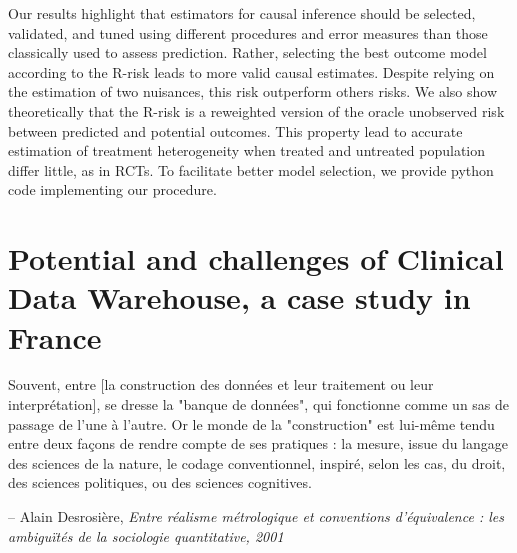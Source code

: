 \documentclass[french,12pt,twoside,a4paper]{book}
\newenvironment{citationbox}{
  \begin{tcolorbox}[
      enhanced,
      colback=gray!10, %
      colframe=white, %
      arc=0mm, %
      boxrule=0.5pt, %
      rightrule=0pt, %
      left=0pt, %
      right=0pt, %
      top=0pt, %
      bottom=0pt, %
      rightupper=0mm, %
      rightlower=0mm, %
      width=0.9\textwidth,
      flush right,
    ]
    \footnotesize %
    \itshape %
    }{
  \end{tcolorbox}%
}
\begin{document}
Our results highlight that estimators for causal inference should be selected,
validated, and tuned using different procedures and error measures than those
classically used to assess prediction. Rather, selecting the best outcome
model according to the R-risk leads to more valid causal estimates. Despite
relying on the estimation of two nuisances, this risk outperform others risks.
We also show theoretically that the R-risk is a reweighted version of the
oracle unobserved risk between predicted and potential outcomes. This property
lead to accurate estimation of treatment heterogeneity when treated and
untreated population differ little, as in RCTs. To facilitate better model
selection, we provide python code implementing our procedure.


\chapter{Potential and challenges of Clinical Data Warehouse, a case study in France}%
\label{chapter:cdw}%


\begin{citationbox}
  Souvent, entre [la construction des données et leur traitement ou leur
      interprétation], se dresse la "banque de données", qui fonctionne comme un
  sas de passage de l'une à l'autre. Or le monde de la "construction" est
  lui-même tendu entre deux façons de rendre compte de ses pratiques : la
  mesure, issue du langage des sciences de la nature, le codage conventionnel,
  inspiré, selon les cas, du droit, des sciences politiques, ou des sciences
  cognitives.%
  \par\hfill -- Alain Desrosière, \textit{Entre réalisme métrologique et
    conventions d'équivalence : les ambiguïtés de la sociologie quantitative, 2001}
\end{citationbox}

\vspace{2cm}
\end{document}

